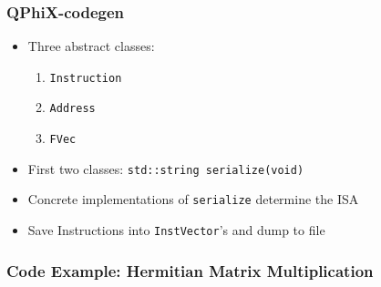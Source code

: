\documentclass{beamer}
\begin{document}

  \begin{frame}
    \frametitle{QPhiX-codegen}

    \begin{itemize}

      \item Three abstract classes:
        \begin{enumerate}
          \item \texttt{Instruction}
          \item \texttt{Address}
          \item \texttt{FVec}
        \end{enumerate}
        \vfill

      \item First two classes: \;\; \texttt{std::string serialize(void)}
        \vfill

      \item Concrete implementations of \texttt{serialize} determine the ISA\\

    

        \vfill

      \item Save Instructions into \texttt{InstVector}'s and dump to file

    \end{itemize}

  \end{frame}


  \begin{frame}[fragile]
    \frametitle{Code Example: Hermitian Matrix Multiplication}
    \small

    
\end{frame}

\end{document}
